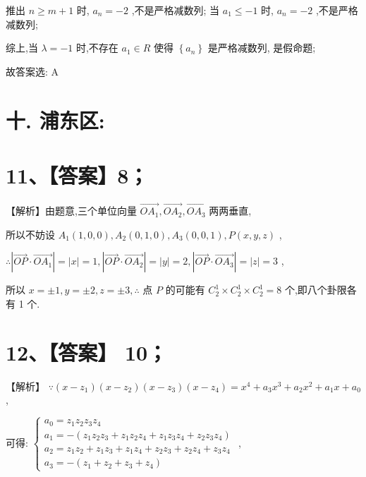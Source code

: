 \documentclass[10pt]{article}
\newcommand*\circled[1]{\tikz[baseline=(char.base)]{\node[shape=circle,draw,inner sep=1.5pt] (char) {\small #1};}}
\begin{document}
推出 \(n \geq  m + 1\) 时, \({a}_{n} =  - 2\) ,不是严格减数列; 当 \({a}_{1} \leq   - 1\) 时, \({a}_{n} =  - 2\) ,不是严格减数列;

综上,当 \(\lambda  =  - 1\) 时,不存在 \({a}_{1} \in  R\) 使得 \(\left\{  {a}_{n}\right\}\) 是严格减数列, \circled{2}  是假命题;

故答案选: A

\section*{十. 浦东区:}

\section*{11、【答案】8；}

【解析】由题意,三个单位向量 \(\overrightarrow{O{A}_{1}},\overrightarrow{O{A}_{2}},\overrightarrow{O{A}_{3}}\) 两两垂直,

所以不妨设 \({A}_{1}\left( {1,0,0}\right) ,{A}_{2}\left( {0,1,0}\right) ,{A}_{3}\left( {0,0,1}\right) ,P\left( {x,y,z}\right)\) ,

\(\therefore \left| {\overrightarrow{OP} \cdot  \overrightarrow{O{A}_{1}}}\right|  = \left| x\right|  = 1,\left| {\overrightarrow{OP} \cdot  \overrightarrow{O{A}_{2}}}\right|  = \left| y\right|  = 2,\left| {\overrightarrow{OP} \cdot  \overrightarrow{O{A}_{3}}}\right|  = \left| z\right|  = 3\) ,

所以 \(x =  \pm  1,y =  \pm  2,z =  \pm  3,\therefore\) 点 \(P\) 的可能有 \({C}_{2}^{1} \times  {C}_{2}^{1} \times  {C}_{2}^{1} = 8\) 个,即八个卦限各有 1 个.

\section*{12、【答案】 10；}

【解析】 \(\because \left( {x - {z}_{1}}\right) \left( {x - {z}_{2}}\right) \left( {x - {z}_{3}}\right) \left( {x - {z}_{4}}\right)  = {x}^{4} + {a}_{3}{x}^{3} + {a}_{2}{x}^{2} + {a}_{1}x + {a}_{0}\) ,

可得: \(\left\{  \begin{array}{l} {a}_{0} = {z}_{1}{z}_{2}{z}_{3}{z}_{4} \\  {a}_{1} =  - \left( {{z}_{1}{z}_{2}{z}_{3} + {z}_{1}{z}_{2}{z}_{4} + {z}_{1}{z}_{3}{z}_{4} + {z}_{2}{z}_{3}{z}_{4}}\right) \\  {a}_{2} = {z}_{1}{z}_{2} + {z}_{1}{z}_{3} + {z}_{1}{z}_{4} + {z}_{2}{z}_{3} + {z}_{2}{z}_{4} + {z}_{3}{z}_{4} \\  {a}_{3} =  - \left( {{z}_{1} + {z}_{2} + {z}_{3} + {z}_{4}}\right)  \end{array}\right.\) ,
\end{document}
